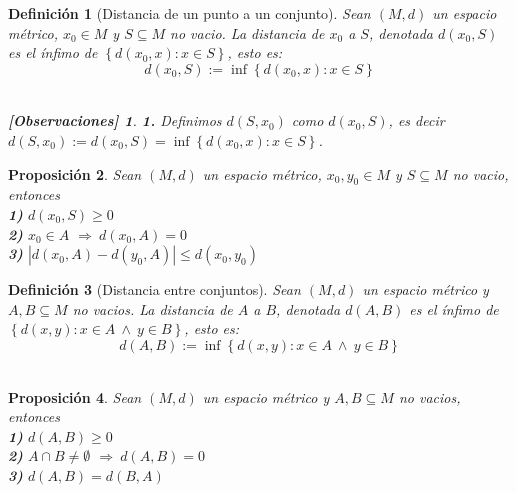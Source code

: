 \documentclass[oneside]{book} %
\theoremstyle{Teorema}
\newtheorem{Definicion}{Definición}[chapter]
\newtheorem{Proposicion}[Definicion]{Proposición}
\theoremstyle{Ejemplos}
\theoremstyle{[Obs]}
\newtheorem*{Obs}{[Observaciones]}
\newcommand{\abs}[1]{\left|#1\right|} %
\renewcommand{\{}{\left\lbrace} %
\renewcommand{\}}{\right\rbrace} %
\newcommand{\y}{\ \wedge\ } %
\newcommand{\n}{\cap} %
\renewcommand{\sc}{\subseteq} %
\newcommand{\Imp}{$\Rightarrow\ $} %
\begin{document}
			\begin{Definicion}[Distancia de un punto a un conjunto]
				
				Sean $(M, d)$ un espacio métrico, $x_0 \in M$ y $S \sc M$ no vacio. La distancia de $x_0$ a $S$, denotada $d(x_0, S)$ es el ínfimo de $\{ d(x_0, x) : x \in S \}$, esto es: \\

				\[ d(x_0, S) := \inf\{ d(x_0, x) : x \in S \} \] \\

				\begin{Obs}
				
					\hfill
				
					\textbf{1.} Definimos $d(S, x_0)$ como $d(x_0, S)$, es decir $d(S, x_0) := d(x_0, S) = \inf\{ d(x_0, x) : x \in S \}$. \\
				
				\end{Obs}

			\end{Definicion}

			\begin{Proposicion}
				
				Sean $(M, d)$ un espacio métrico, $x_0, y_0 \in M$ y $S \sc M$ no vacio, entonces \\
				
				\textbf{1)} $d(x_0, S) \geq 0$ \\

				\textbf{2)} $x_0 \in A$ \Imp $d(x_0, A) = 0$ \\

				\textbf{3)} $\abs{d(x_0, A) - d(y_0, A)} \leq d(x_0, y_0)$ \\

			\end{Proposicion}

			\begin{Definicion}[Distancia entre conjuntos]
				
				Sean $(M, d)$ un espacio métrico y $A, B \sc M$ no vacios. La distancia de $A$ a $B$, denotada $d(A, B)$ es el ínfimo de $\{ d(x, y) : x \in A \y y \in B \}$, esto es: \\

				\[ d(A, B) := \inf\{ d(x, y) : x \in A \y y \in B \} \] \\

			\end{Definicion}

			\begin{Proposicion}
				
				Sean $(M, d)$ un espacio métrico y $A, B \sc M$ no vacios, entonces \\
				
				\textbf{1)} $d(A, B) \geq 0$ \\

				\textbf{2)} $A \n B \neq \emptyset$ \Imp $d(A, B) = 0$ \\

				\textbf{3)} $d(A, B) = d(B, A)$ \\

			\end{Proposicion}
\end{document}
